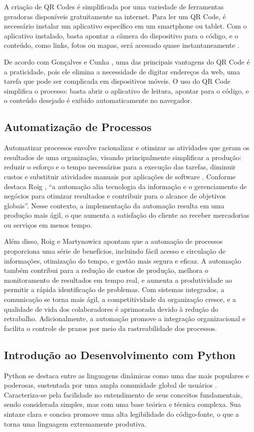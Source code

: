 A criação de QR Codes é simplificada por uma variedade de ferramentas geradoras disponíveis gratuitamente na internet. Para ler um QR Code, é necessário instalar um aplicativo específico em um smartphone ou tablet. Com o aplicativo instalado, basta apontar a câmera do dispositivo para o código, e o conteúdo, como links, fotos ou mapas, será acessado quase instantaneamente \cite{bernardo2011}.

De acordo com Gonçalves e Cunha \cite{goncalves2014}, uma das principais vantagens do QR Code é a praticidade, pois ele elimina a necessidade de digitar endereços da web, uma tarefa que pode ser complicada em dispositivos móveis. O uso do QR Code simplifica o processo: basta abrir o aplicativo de leitura, apontar para o código, e o conteúdo desejado é exibido automaticamente no navegador.

\subsection{Automatização de Processos}
Automatizar processos envolve racionalizar e otimizar as atividades que geram os resultados de uma organização, visando principalmente simplificar a produção: reduzir o esforço e o tempo necessários para a execução das tarefas, diminuir custos e substituir atividades manuais por aplicações de software \cite{roig2017}. Conforme destaca Roig \cite{roig2017}, “a automação alia tecnologia da informação e o gerenciamento de negócios para otimizar resultados e contribuir para o alcance de objetivos globais”. Nesse contexto, a implementação da automação resulta em uma produção mais ágil, o que aumenta a satisfação do cliente ao receber mercadorias ou serviços em menos tempo.

Além disso, Roig \cite{roig2017} e Martynowicz \cite{martynowicz2018} apontam que a automação de processos proporciona uma série de benefícios, incluindo fácil acesso e circulação de informações, otimização do tempo, e gestão mais segura e eficaz. A automação também contribui para a redução de custos de produção, melhora o monitoramento de resultados em tempo real, e aumenta a produtividade ao permitir a rápida identificação de problemas. Com sistemas integrados, a comunicação se torna mais ágil, a competitividade da organização cresce, e a qualidade de vida dos colaboradores é aprimorada devido à redução do retrabalho. Adicionalmente, a automação promove a integração organizacional e facilita o controle de prazos por meio da rastreabilidade dos processos.

\subsection{Introdução ao Desenvolvimento com Python}
Python se destaca entre as linguagens dinâmicas como uma das mais populares e poderosas, sustentada por uma ampla comunidade global de usuários \cite{borges2010}. Caracteriza-se pela facilidade no entendimento de seus conceitos fundamentais, sendo considerada simples, mas com uma base teórica e técnica complexa. Sua sintaxe clara e concisa promove uma alta legibilidade do código-fonte, o que a torna uma linguagem extremamente produtiva.

